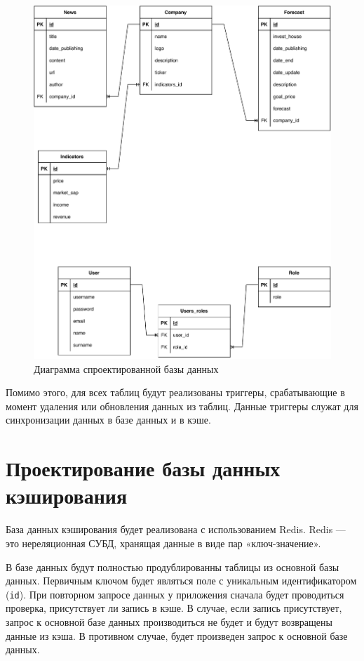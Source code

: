 \begin{figure}[h!]
	\begin{center}
		\includegraphics[scale=0.8]{img/database.pdf}
	\end{center}
	\captionsetup{justification=centering}
	\caption{Диаграмма спроектированной базы данных}
	\label{img:database}
\end{figure}

\newpage

Помимо этого, для всех таблиц будут реализованы триггеры, срабатывающие в момент удаления или обновления данных из таблиц. Данные триггеры служат для синхронизации данных в базе данных и в кэше.
\section{Проектирование базы данных кэширования}

База данных кэширования будет реализована с использованием Redis. Redis --- это нереляционная СУБД, хранящая данные в виде пар «ключ-значение».

В базе данных будут полностью продублированны таблицы из основной базы данных. Первичным ключом будет являться поле с уникальным идентификатором (\texttt{id}).
При повторном запросе данных у приложения сначала будет проводиться проверка, присутствует ли запись в кэше. В случае, если запись присутствует, запрос к основной базе данных производиться не будет и будут возвращены данные из кэша. В противном случае, будет произведен запрос к основной базе данных.

